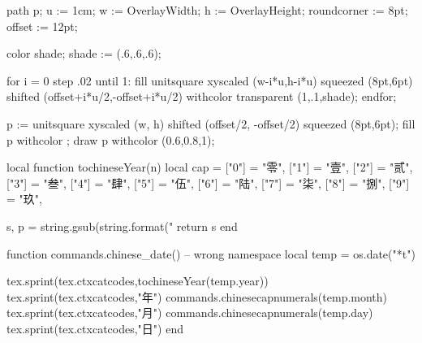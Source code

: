     path p;
    u := 1cm; w := OverlayWidth; h := OverlayHeight;
    roundcorner := 8pt; offset := 12pt;

    color shade;
    shade := (.6,.6,.6);

    for i = 0 step .02 until 1:
        fill unitsquare xyscaled (w-i*u,h-i*u) squeezed (8pt,6pt)
             shifted (offset+i*u/2,-offset+i*u/2)
             withcolor transparent (1,.1,shade);
    endfor;

    p := unitsquare xyscaled (w, h) shifted (offset/2, -offset/2) squeezed (8pt,6pt);
    fill p withcolor ;
    draw p withcolor (0.6,0.8,1);
\stopuniqueMPgraphic
{}%
\def\startEnglish{\dostartEnglish}

\long{}

\def\startEnglishWithoutWhiteSpace{\dostartEnglishWithoutWhiteSpace}

\long\def\dostartEnglishWithoutWhiteSpace#1\stopEnglishWithoutWhiteSpace{%
{\setscript[no]
\mainlanguage[en]
\setupindenting[no]%
\setupwhitespace[medium]%
\setupinterlinespace[medium]%
\blank[1ex]
#1%
\blank[1ex]}
}
\startluacode
local function tochineseYear(n)
	local cap = {
		["0"] = "零",
		["1"] = "壹",
		["2"] = "贰",
		["3"] = "叁",
		["4"] = "肆",
		["5"] = "伍",
		["6"] = "陆",
		["7"] = "柒",
		["8"] = "捌",
		["9"] = "玖",
	}

	s, p = string.gsub(string.format("%
	return s
end

function commands.chinese_date() -- wrong namespace
	local temp = os.date("*t")

	tex.sprint(tex.ctxcatcodes,tochineseYear(temp.year))
	tex.sprint(tex.ctxcatcodes,"年")
	commands.chinesecapnumerals(temp.month)
	tex.sprint(tex.ctxcatcodes,"月")
	commands.chinesecapnumerals(temp.day)
	tex.sprint(tex.ctxcatcodes,"日")
end
\stopluacode


\chardef\kindofpagetextareas\plusone

\let\stdfootnote\footnote
\def\footnote#1{%
\stdfootnote{\setscript[hanzi]#1}%
}

\problem{}
\stopenvironment


